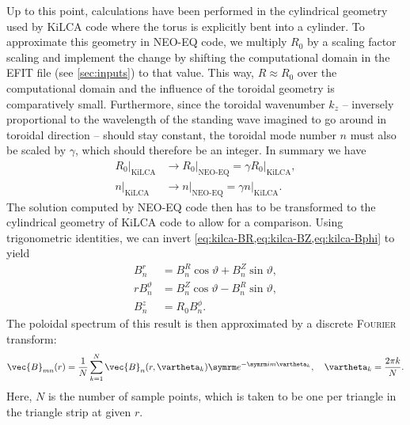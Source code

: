 Up to this point, calculations have been performed in the cylindrical geometry used by KiLCA code where the torus is explicitly bent into a cylinder. To approximate this geometry in NEO-EQ code, we multiply $R_0$ by a scaling factor \gls{scaling} and implement the change by shifting the computational domain in the EFIT file (see \cref{sec:inputs}) to that value. This way, $R \approx R_{0}$ over the computational domain and the influence of the toroidal geometry is comparatively small. Furthermore, since the toroidal wavenumber $k_{z}$ -- inversely proportional to the wavelength of the standing wave imagined to go around in toroidal direction -- should stay constant, the toroidal mode number $n$ must also be scaled by $\gamma$, which should therefore be an integer. In summary we have
\begin{align}
  R_{0} \rvert_{\text{KiLCA}} &\to R_{0} \rvert_{\text{NEO-EQ}} = \gamma R_{0} \rvert_{\text{KiLCA}}, \\
  n \rvert_{\text{KiLCA}} &\to n \rvert_{\text{NEO-EQ}} = \gamma n \rvert_{\text{KiLCA}}.
\end{align}
The solution computed by NEO-EQ code then has to be transformed to the cylindrical geometry of KiLCA code to allow for a comparison. Using trigonometric identities, we can invert \cref{eq:kilca-BR,eq:kilca-BZ,eq:kilca-Bphi} to yield
\begin{align}
  B_{n}^{r} &= B_{n}^{R} \cos \vartheta + B_{n}^{Z} \sin \vartheta, \\
  r B_{n}^{\vartheta} &= B_{n}^{Z} \cos \vartheta - B_{n}^{R} \sin \vartheta, \\
  B_{n}^{z} &= R_{0} B_{n}^{\phi}.
\end{align}
The poloidal spectrum of this result is then approximated by a discrete \textsc{Fourier} transform:
\begin{gather}
  \vec{B}_{m n} (r) = \frac{1}{N} \sum_{k = 1}^{N} \vec{B}_{n} (r, \vartheta_{k}) \e^{-\im m \vartheta_{k}}, \quad \vartheta_{k} = \frac{2 \pi k}{N}.
\end{gather}
Here, $N$ is the number of sample points, which is taken to be one per triangle in the triangle strip at given $r$.

